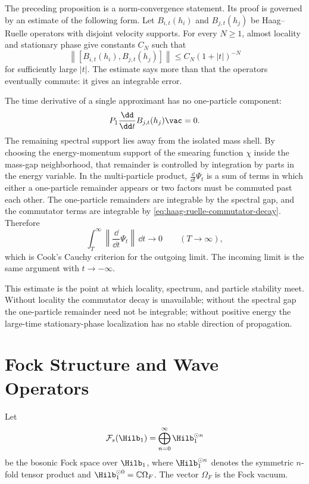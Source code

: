 The preceding proposition is a norm-convergence statement.  Its proof is
governed by an estimate of the following form.  Let \(B_{i,t}(h_i)\) and
\(B_{j,t}(h_j)\) be Haag--Ruelle operators with disjoint velocity supports.
For every \(N\ge1\), almost locality and stationary phase give constants
\(C_N\) such that
\begin{equation}
  \left\|
  [B_{i,t}(h_i),B_{j,t}(h_j)]
  \right\|
  \le
  C_N(1+|t|)^{-N}
  \label{eq:haag-ruelle-commutator-decay}
\end{equation}
for sufficiently large \(|t|\).  The estimate says more than that the
operators eventually commute: it gives an integrable error.

The time derivative of a single approximant has no one-particle component:
\[
  P_1\frac{\dd}{\dd t}B_{j,t}(h_j)\vac=0 .
\]
The remaining spectral support lies away from the isolated mass shell.  By
choosing the energy-momentum support of the smearing function \(\chi\) inside
the mass-gap neighborhood, that remainder is controlled by integration by
parts in the energy variable.  In the multi-particle product,
\(\frac{\dd}{\dd t}\Psi_t\) is a sum of terms in which either a one-particle
remainder appears or two factors must be commuted past each other.  The
one-particle remainders are integrable by the spectral gap, and the commutator
terms are integrable by \eqref{eq:haag-ruelle-commutator-decay}.  Therefore
\[
  \int_T^\infty
  \left\|\frac{\dd}{\dd t}\Psi_t\right\|\,\dd t
  \longrightarrow0
  \qquad (T\to\infty),
\]
which is Cook's Cauchy criterion for the outgoing limit.  The incoming limit
is the same argument with \(t\to-\infty\).

This estimate is the point at which locality, spectrum, and particle
stability meet.  Without locality the commutator decay is unavailable; without
the spectral gap the one-particle remainder need not be integrable; without
positive energy the large-time stationary-phase localization has no stable
direction of propagation.

\section{Fock Structure and Wave Operators}

\begin{definition}
\label{def:hr-scalar-asymptotic-fock-space}
Let
\[
  \mathcal F_s(\Hilb_1)
  =
  \bigoplus_{n=0}^\infty \Hilb_1^{\odot n}
\]
be the bosonic Fock space over \(\Hilb_1\), where
\(\Hilb_1^{\odot n}\) denotes the symmetric \(n\)-fold tensor product and
\(\Hilb_1^{\odot0}=\mathbb C\Omega_F\). The vector \(\Omega_F\) is the Fock
vacuum.
\end{definition}

